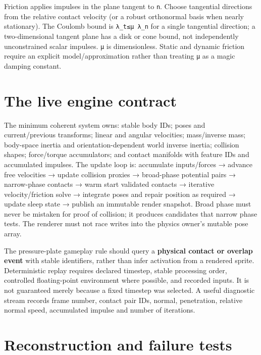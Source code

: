 Friction applies impulses in the plane tangent to \texttt{n}. Choose tangential directions from the relative contact velocity (or a robust orthonormal basis when nearly stationary). The Coulomb bound is \texttt{\textbar{}λ\_t\textbar{}≤μ\ λ\_n} for a single tangential direction; a two-dimensional tangent plane has a disk or cone bound, not independently unconstrained scalar impulses. \texttt{μ} is dimensionless. Static and dynamic friction require an explicit model/approximation rather than treating \texttt{μ} as a magic damping constant.

\section{The live engine contract}\label{06-engine-ii-ch033-the-live-engine-contract}

The minimum coherent system owns: stable body IDs; poses and current/previous transforms; linear and angular velocities; mass/inverse mass; body-space inertia and orientation-dependent world inverse inertia; collision shapes; force/torque accumulators; and contact manifolds with feature IDs and accumulated impulses. The update loop is: accumulate inputs/forces → advance free velocities → update collision proxies → broad-phase potential pairs → narrow-phase contacts → warm start validated contacts → iterative velocity/friction solve → integrate poses and repair position as required → update sleep state → publish an immutable render snapshot. Broad phase must never be mistaken for proof of collision; it produces candidates that narrow phase tests. The renderer must not race writes into the physics owner's mutable pose array.

The pressure-plate gameplay rule should query a \textbf{physical contact or overlap event} with stable identifiers, rather than infer activation from a rendered sprite. Deterministic replay requires declared timestep, stable processing order, controlled floating-point environment where possible, and recorded inputs. It is not guaranteed merely because a fixed timestep was selected. A useful diagnostic stream records frame number, contact pair IDs, normal, penetration, relative normal speed, accumulated impulse and number of iterations.

\section{Reconstruction and failure tests}\label{06-engine-ii-ch033-reconstruction-and-failure-tests}

